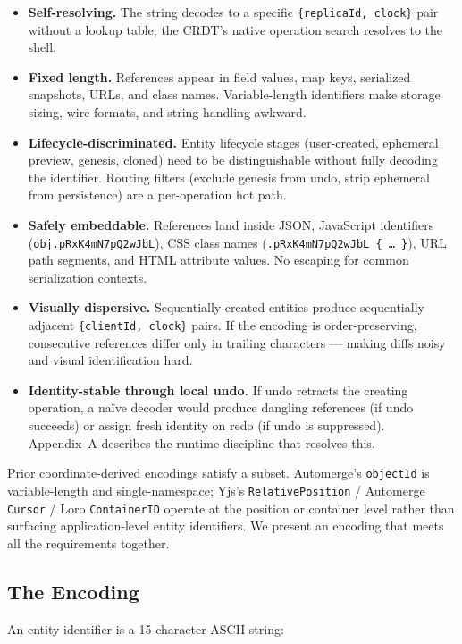 \begin{itemize}
    \item \textbf{Self-resolving.} The string decodes to a specific \texttt{\{replicaId, clock\}} pair without a lookup table; the CRDT's native operation search resolves to the shell.
    \item \textbf{Fixed length.} References appear in field values, map keys, serialized snapshots, URLs, and class names. Variable-length identifiers make storage sizing, wire formats, and string handling awkward.
    \item \textbf{Lifecycle-discriminated.} Entity lifecycle stages (user-created, ephemeral preview, genesis, cloned) need to be distinguishable without fully decoding the identifier. Routing filters (exclude genesis from undo, strip ephemeral from persistence) are a per-operation hot path.
    \item \textbf{Safely embeddable.} References land inside JSON, JavaScript identifiers (\texttt{obj.pRxK4mN7pQ2wJbL}), CSS class names (\texttt{.pRxK4mN7pQ2wJbL \{ \ldots{} \}}), URL path segments, and HTML attribute values. No escaping for common serialization contexts.
    \item \textbf{Visually dispersive.} Sequentially created entities produce sequentially adjacent \texttt{\{clientId, clock\}} pairs. If the encoding is order-preserving, consecutive references differ only in trailing characters --- making diffs noisy and visual identification hard.
    \item \textbf{Identity-stable through local undo.} If undo retracts the creating operation, a na\"ive decoder would produce dangling references (if undo succeeds) or assign fresh identity on redo (if undo is suppressed). Appendix~A describes the runtime discipline that resolves this.
\end{itemize}

Prior coordinate-derived encodings satisfy a subset. Automerge's \texttt{objectId} is variable-length and single-namespace; Yjs's \texttt{RelativePosition} / Automerge \texttt{Cursor} / Loro \texttt{ContainerID} operate at the position or container level rather than surfacing application-level entity identifiers. We present an encoding that meets all the requirements together.

\subsection{The Encoding}

An entity identifier is a 15-character ASCII string:

